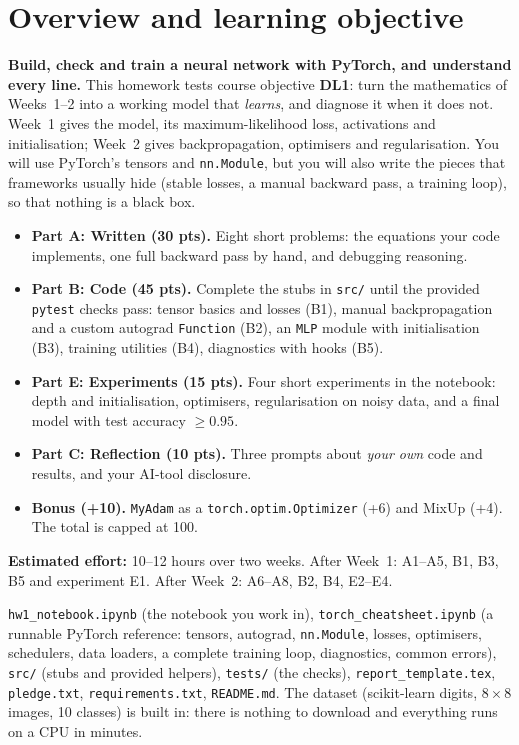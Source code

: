 \documentclass[11pt,a4paper]{article}
\begin{document}
\academytitle
\assignmentmeta

\section{Overview and learning objective}
\textbf{Build, check and train a neural network with PyTorch, and understand every line.} This homework tests course objective \textbf{DL1}: turn the
mathematics of Weeks~1--2 into a working model that \emph{learns}, and diagnose it when it does not. Week~1 gives the model, its maximum-likelihood
loss, activations and initialisation; Week~2 gives backpropagation, optimisers and regularisation. You will use PyTorch's tensors and \texttt{nn.Module},
but you will also write the pieces that frameworks usually hide (stable losses, a manual backward pass, a training loop), so that nothing is a black box.

\begin{itemize}
  \item \textbf{Part A: Written (30 pts).} Eight short problems: the equations your code implements, one full backward pass by hand, and debugging reasoning.
  \item \textbf{Part B: Code (45 pts).} Complete the stubs in \texttt{src/} until the provided \texttt{pytest} checks pass: tensor basics and losses (B1), manual
        backpropagation and a custom autograd \texttt{Function} (B2), an \texttt{MLP} module with initialisation (B3), training utilities (B4), diagnostics with hooks (B5).
  \item \textbf{Part E: Experiments (15 pts).} Four short experiments in the notebook: depth and initialisation, optimisers, regularisation on noisy data,
        and a final model with test accuracy $\ge0.95$.
  \item \textbf{Part C: Reflection (10 pts).} Three prompts about \emph{your own} code and results, and your AI-tool disclosure.
  \item \textbf{Bonus (+10).} \texttt{MyAdam} as a \texttt{torch.optim.Optimizer} (+6) and MixUp (+4). The total is capped at 100.
\end{itemize}

\noindent\textbf{Estimated effort:} 10--12 hours over two weeks. After Week~1: A1--A5, B1, B3, B5 and experiment E1. After Week~2: A6--A8, B2, B4, E2--E4.

\begin{infobox}[title={What you start from (the homework kit)}]
\texttt{hw1\_notebook.ipynb} (the notebook you work in), \texttt{torch\_cheatsheet.ipynb} (a runnable PyTorch reference: tensors, autograd, \texttt{nn.Module}, losses,
optimisers, schedulers, data loaders, a complete training loop, diagnostics, common errors), \texttt{src/} (stubs and provided helpers), \texttt{tests/} (the checks),
\texttt{report\_template.tex}, \texttt{pledge.txt}, \texttt{requirements.txt}, \texttt{README.md}. The dataset (scikit-learn digits, $8\times8$ images, 10 classes) is built in:
there is nothing to download and everything runs on a CPU in minutes.
\end{infobox}
\end{document}
